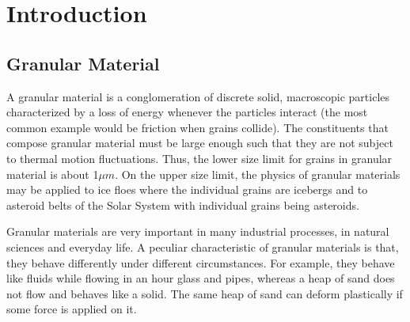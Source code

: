 %
% 


\chapter{Introduction}

\section{Granular Material}

\begin{figure}[H]
\end{figure}

A granular material is a conglomeration of discrete solid, macroscopic particles characterized by a loss of energy whenever the particles interact (the most common example would be friction when grains collide). The constituents that compose granular material must be large enough such that they are not subject to thermal motion fluctuations. Thus, the lower size limit for grains in granular material is about 1$\mu m$. On the upper size limit, the physics of granular materials may be applied to ice floes where the individual grains are icebergs and to asteroid belts of the Solar System with individual grains being asteroids. \citep{duran}

Granular materials are very important in many industrial processes, in natural sciences and everyday life. A peculiar characteristic of granular materials is that, they behave differently under different circumstances. For example, they behave like fluids while flowing in an hour glass and pipes, whereas a heap of sand does not flow and behaves like a solid. The same heap of sand can deform plastically if some force is applied on it.

